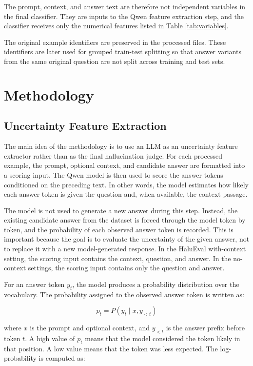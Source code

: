 \documentclass[11pt]{article}
\begin{document}
The prompt, context, and answer text are therefore not independent variables in the final classifier. They are inputs to the Qwen feature extraction step, and the classifier receives only the numerical features listed in Table \ref{tab:variables}.

The original example identifiers are preserved in the processed files. These identifiers are later used for grouped train-test splitting so that answer variants from the same original question are not split across training and test sets.

\newpage

\section{Methodology}

\subsection{Uncertainty Feature Extraction}
The main idea of the methodology is to use an LLM as an uncertainty feature extractor rather than as the final hallucination judge. For each processed example, the prompt, optional context, and candidate answer are formatted into a scoring input. The Qwen model is then used to score the answer tokens conditioned on the preceding text. In other words, the model estimates how likely each answer token is given the question and, when available, the context passage.

The model is not used to generate a new answer during this step. Instead, the existing candidate answer from the dataset is forced through the model token by token, and the probability of each observed answer token is recorded. This is important because the goal is to evaluate the uncertainty of the given answer, not to replace it with a new model-generated response. In the HaluEval with-context setting, the scoring input contains the context, question, and answer. In the no-context settings, the scoring input contains only the question and answer.

For an answer token $y_t$, the model produces a probability distribution over the vocabulary. The probability assigned to the observed answer token is written as:

\[
p_t = P(y_t \mid x, y_{<t})
\]

where $x$ is the prompt and optional context, and $y_{<t}$ is the answer prefix before token $t$. A high value of $p_t$ means that the model considered the token likely in that position. A low value means that the token was less expected. The log-probability is computed as:
\end{document}
